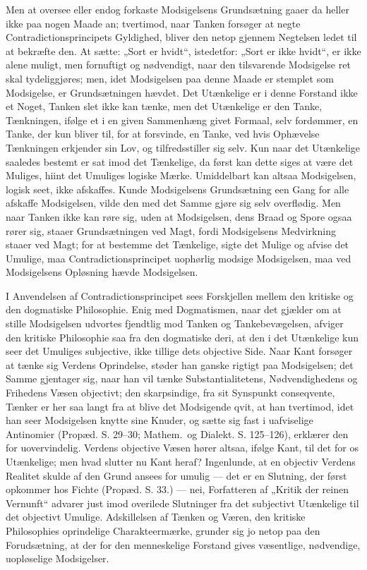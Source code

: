 \documentclass[12pt,a4paper]{book}
\begin{document}
Men at oversee eller endog forkaste Modsigelsens Grundsætning gaaer da
heller ikke paa nogen Maade an; tvertimod, naar Tanken forsøger at
negte Contradictionsprincipets Gyldighed, bliver den netop gjennem
Negtelsen ledet til at bekræfte den. At sætte: „Sort er hvidt“,
istedetfor: „Sort er ikke hvidt“, er ikke alene muligt, men fornuftigt
og nødvendigt, naar den tilsvarende Modsigelse ret skal
tydeliggjøres; men, idet Modsigelsen paa denne Maade er stemplet som
Modsigelse, er Grundsætningen hævdet. Det Utænkelige er i denne
Forstand ikke et Noget, Tanken slet ikke kan tænke, men det Utænkelige
er den Tanke, Tænkningen, ifølge et i en given Sammenhæng givet
Formaal, selv fordømmer, en Tanke, der kun bliver til, for at
forsvinde, en Tanke, ved hvis Ophævelse Tænkningen erkjender sin Lov,
og tilfredsstiller sig selv. Kun naar det Utænkelige saaledes bestemt
er sat imod det Tænkelige, da først kan dette siges at være det
Muliges, hiint det Umuliges logiske Mærke. Umiddelbart kan altsaa
Modsigelsen, logisk seet, ikke afskaffes. Kunde Modsigelsens
Grundsætning een Gang for alle afskaffe Modsigelsen, vilde den med det
Samme gjøre sig selv overflødig. Men naar Tanken ikke kan røre sig,
uden at Modsigelsen, dens Braad og Spore ogsaa rører sig, staaer
Grundsætningen ved Magt, fordi Modsigelsens Medvirkning staaer ved
Magt; for at bestemme det Tænkelige, sigte det Mulige og afvise det
Umulige, maa Contradictionsprincipet uophørlig modsige Modsigelsen,
maa ved Modsigelsens Opløsning hævde Modsigelsen.

I Anvendelsen af Contradictionsprincipet sees Forskjellen mellem den
kritiske og den dogmatiske Philosophie. Enig med Dogmatismen, naar
det gjælder om at stille Modsigelsen udvortes fjendtlig mod Tanken og
Tankebevægelsen, afviger den kritiske Philosophie saa fra den
dogmatiske deri, at den i det Utænkelige kun seer det Umuliges
subjective, ikke tillige dets
objective Side. Naar Kant forsøger at tænke sig Verdens Oprindelse,
støder han ganske rigtigt paa Modsigelsen; det Samme gjentager sig,
naar han vil tænke Substantialitetens, Nødvendighedens og Frihedens
Væsen objectivt; den skarpsindige, fra sit Synspunkt conseqvente,
Tænker er her saa langt fra at blive det Modsigende qvit, at han
tvertimod, idet han seer Modsigelsen knytte sine Knuder, og sætte sig
fast i uafviselige Antinomier (Propæd. S. 29--30; Mathem.\ og
Dialekt. S. 125--126), erklærer den for uovervindelig. Verdens
objective Væsen hører altsaa, ifølge Kant, til det for os Utænkelige;
men hvad slutter nu Kant heraf? Ingenlunde, at en objectiv Verdens
Realitet skulde af den Grund ansees for umulig --- det er en Slutning,
der først opkommer hos Fichte (Propæd. S. 33.) --- nei, Forfatteren af
„Kritik der reinen Vernunft“ advarer just imod overilede Slutninger
fra det subjectivt Utænkelige til det objectivt Umulige. Adskillelsen
af Tænken og Væren, den kritiske Philosophies oprindelige
Charakteermærke, grunder sig jo netop paa den Forudsætning, at der for
den menneskelige Forstand gives væsentlige, nødvendige, uopløselige
Modsigelser.
\end{document}
